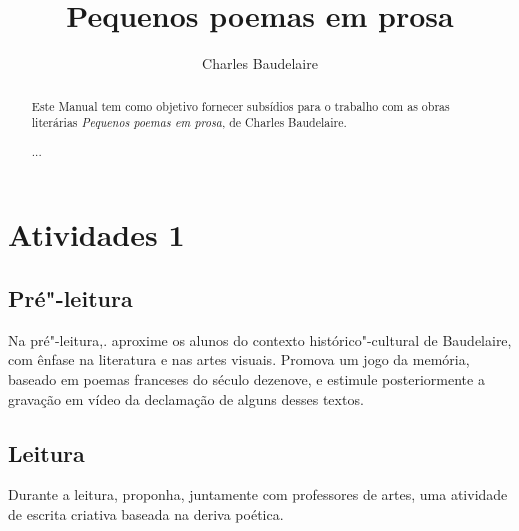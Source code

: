 \documentclass[12pt]{extarticle}
\begin{document}
\newcommand{\AutorLivro}{Charles Baudelaire}
\newcommand{\TituloLivro}{Pequenos poemas em prosa}
\newcommand{\Tema}{Ficção, mistério e fantasia}
\newcommand{\Genero}{Poema}
\newcommand{\imagemCapa}{./images/PNLD0010-01.png}
\newcommand{\issnppub}{---}
\newcommand{\issnepub}{---}
\newcommand{\colaborador}{\textbf{Bruno Gradella e Vicente Castro} é uma pessoa incrível e vai fazer um bom serviço.}


\title{\TituloLivro}
\author{\AutorLivro}
\def\authornotes{\colaborador}

\date{}
\maketitle


\begin{abstract}
Este Manual tem como objetivo fornecer subsídios para o trabalho com as
obras literárias \emph{Pequenos poemas em prosa}, de Charles Baudelaire.

...
\end{abstract}

\tableofcontents

\section{Atividades 1}


\subsection{Pré"-leitura}


Na pré"-leitura,. aproxime os alunos do contexto
histórico"-cultural de Baudelaire, com ênfase na literatura e nas artes
visuais.
Promova um jogo da memória, baseado em poemas franceses do século
dezenove, e estimule posteriormente a gravação em vídeo da declamação
de alguns desses textos.

\subsection{Leitura}


Durante a leitura, proponha, juntamente com professores de
artes, uma atividade de escrita criativa baseada na deriva poética.
\end{document}
